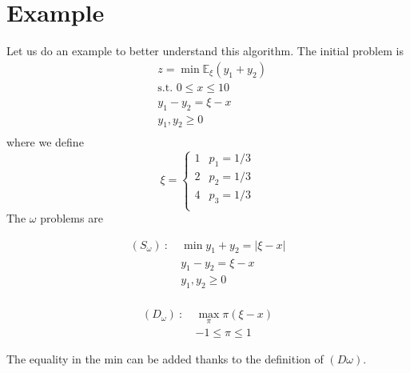 \documentclass[12pt, openany]{report}
\newcommand{\E}{\mathbb{E}}
\theoremstyle{definition}
\begin{document}
\section{Example}\label{sec:lshaped_example}
Let us do an example to better understand this algorithm. The initial problem is 
\begin{equation}
	\begin{aligned}
		&z = \min\E_\xi(y_1 + y_2)\\
		& \text{s.t. }0\le x\le 10\\
		& y_1-y_2 = \xi-x\\
		& y_1,y_2\ge 0\\
	\end{aligned}
\end{equation}
where we define 
\begin{equation}
	\xi = \begin{cases}
		1 & p_1 = 1/3\\
		2 & p_2 = 1/3\\
		4 & p_3 = 1/3\\
	\end{cases}
\end{equation}
The $\omega$ problems are \\
\begin{minipage}{.5\textwidth}
	\begin{equation}
		\begin{aligned}
			(S_\omega)\ : \ &\min y_1 + y_2 = |\xi-x|\\
			& y_1 - y_2 = \xi - x\\
			& y_1,y_2 \ge 0\\
		\end{aligned}
	\end{equation}
\end{minipage}
\begin{minipage}{.5\textwidth}
	\begin{equation}
		\begin{aligned}
			(D_\omega) \ : \ & \max_\pi \pi(\xi-x)\\
			&-1\le \pi\le 1
		\end{aligned}
	\end{equation}
\end{minipage}
The equality in the min can be added thanks to the definition of $(D\omega)$.
\end{document}

